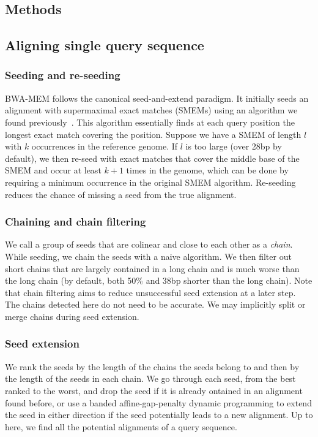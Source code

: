 \documentclass{bioinfo}
\begin{document}
\begin{methods}

\section{Methods}

\subsection{Aligning single query sequence}

\subsubsection{Seeding and re-seeding} BWA-MEM follows the canonical
seed-and-extend paradigm. It initially seeds an alignment with supermaximal
exact matches (SMEMs) using an algorithm we found previously~\citep[Algorithm 5]{Li:2012fk}. This algorithm
essentially finds at each query position the longest exact match covering the
position. Suppose we have a SMEM of length $l$ with $k$ occurrences in the
reference genome. If $l$ is too large (over 28bp by default), we then re-seed
with exact matches that cover the middle base of the SMEM and occur at least
$k+1$ times in the genome, which can be done by requiring a minimum occurrence
in the original SMEM algorithm. Re-seeding reduces the chance of missing a seed
from the true alignment.

\subsubsection{Chaining and chain filtering} We call a group of seeds that are
colinear and close to each other as a \emph{chain}. While seeding, we chain
the seeds with a naive algorithm. We then filter out short chains that are
largely contained in a long chain and is much worse than the long chain (by
default, both 50\% and 38bp shorter than the long chain). Note that chain
filtering aims to reduce unsuccessful seed extension at a later step. The
chains detected here do not need to be accurate. We may implicitly split or
merge chains during seed extension.

\subsubsection{Seed extension} We rank the seeds by the length of the chains
the seeds belong to and then by the length of the seeds in each chain. We go
through each seed, from the best ranked to the worst, and drop the seed if it
is already ontained in an alignment found before, or use a banded
affine-gap-penalty dynamic programming to extend the seed in either direction
if the seed potentially leads to a new alignment. Up to here, we find all
the potential alignments of a query sequence.


\end{methods}
\end{document}
